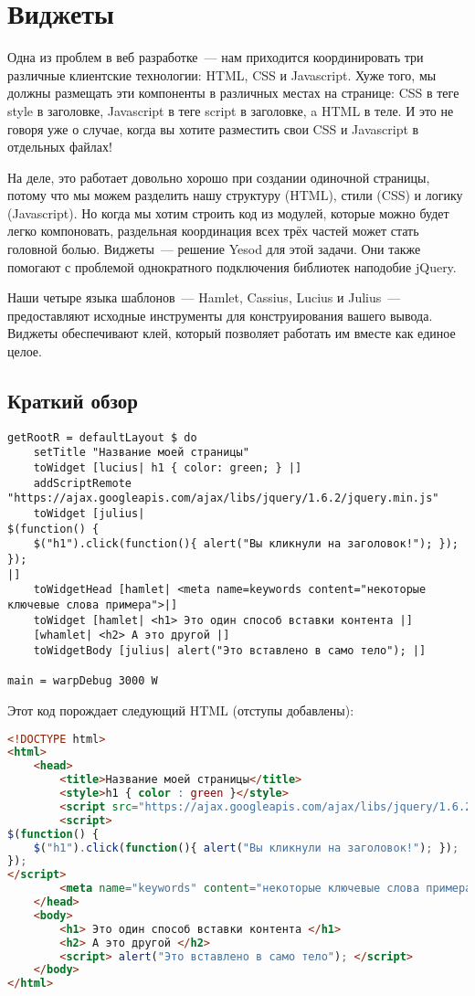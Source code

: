 \chapter{Виджеты}
Одна из проблем в веб разработке~--- нам приходится координировать три
различные клиентские технологии: HTML, CSS и Javascript. Хуже того, мы должны
размещать эти компоненты в различных местах на странице: CSS в теге style в
заголовке, Javascript в теге script в заголовке, a HTML в теле. И это не говоря
уже о случае, когда вы хотите разместить свои CSS и Javascript в отдельных
файлах!

На деле, это работает довольно хорошо при создании одиночной страницы, потому
что мы можем разделить нашу структуру (HTML), стили (CSS) и логику
(Javascript). Но когда мы хотим строить код из модулей, которые можно будет
легко компоновать, раздельная координация всех трёх частей может стать головной
болью. Виджеты~--- решение Yesod для этой задачи. Они также помогают с
проблемой однократного подключения библиотек наподобие jQuery.

Наши четыре языка шаблонов~--- Hamlet, Cassius, Lucius и Julius~---
предоставляют исходные инструменты для конструирования вашего вывода. Виджеты
обеспечивают клей, который позволяет работать им вместе как единое целое.

\section{Краткий обзор}
\begin{lstlisting}
getRootR = defaultLayout $ do
    setTitle "Название моей страницы"
    toWidget [lucius| h1 { color: green; } |]
    addScriptRemote "https://ajax.googleapis.com/ajax/libs/jquery/1.6.2/jquery.min.js"
    toWidget [julius|
$(function() {
    $("h1").click(function(){ alert("Вы кликнули на заголовок!"); });
});
|]
    toWidgetHead [hamlet| <meta name=keywords content="некоторые ключевые слова примера">|]
    toWidget [hamlet| <h1> Это один способ вставки контента |]
    [whamlet| <h2> А это другой |]
    toWidgetBody [julius| alert("Это вставлено в само тело"); |]

main = warpDebug 3000 W
\end{lstlisting}
Этот код порождает следующий HTML (отступы добавлены):
\begin{lstlisting}[language=HTML]
<!DOCTYPE html>
<html>
    <head>
        <title>Название моей страницы</title>
        <style>h1 { color : green }</style>
        <script src="https://ajax.googleapis.com/ajax/libs/jquery/1.6.2/jquery.min.js"></script>
        <script>
$(function() {
    $("h1").click(function(){ alert("Вы кликнули на заголовок!"); });
});
</script>
        <meta name="keywords" content="некоторые ключевые слова примера">
    </head>
    <body>
        <h1> Это один способ вставки контента </h1>
        <h2> А это другой </h2>
        <script> alert("Это вставлено в само тело"); </script>
    </body>
</html>
\end{lstlisting}

